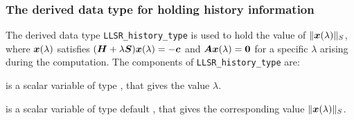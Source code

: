 \documentclass{galahad}
\newcommand{\packagename}{LLSR}
\begin{document}

\subsubsection{The derived data type for holding history
 information}\label{typehist}
The derived data type
{\tt \packagename\_history\_type}
is used to hold the value of $\|{\bm{x}}(\lambda)\|_S$, where
${\bm{x}}(\lambda)$ satisfies
$({\bm{H}} + \lambda {\bm{S}}){\bm{x}}(\lambda) = - {\bm{c}}$ and ${\bm{A}}{\bm{x}}(\lambda) = {\bm{0}}$
for a specific $\lambda$ arising during the computation.
The components of
{\tt \packagename\_history\_type}
are:
\begin{description}
 is a scalar variable of type \realdp, that gives
 the value $\lambda$.

 is a scalar variable of type default \real, that gives
 the corresponding value $\|{\bm{x}}(\lambda)\|_S$.

\end{description}

\end{document}
